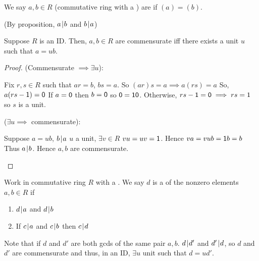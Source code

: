 \documentclass[notes.tex]{subfiles}
\begin{document}
\begin{defn}
	We say $a, b\in R$ (commutative ring with a \one) are  if $(a) = (b)$.

	(By proposition, $a\mkern2mu|\mkern1mu b$ and $b\mkern2mu|\mkern1mu a$)
\end{defn}

\begin{proposition}
	Suppose $R$ is an ID.
	Then, $a,b\in R$ are commensurate iff there exists a unit $u$ such that $a=ub$.
\end{proposition}
\begin{proof}
	(Commensurate $\implies \exists u$):
	\begin{tabin}
		Fix $r, s\in R$ such that $ar = b$, $bs = a$.
		So $(ar)s = a \implies a(rs) = a$ So, $a(rs-\mathsf{1}) = \mathsf{0}$
		If $a = \mathsf{0}$ then $b= \mathsf{0}$ so $\mathsf{0}=\mathsf{1}\mathsf{0}$.
		Otherwise, $rs - \mathsf{1} = \mathsf{0} \implies rs = 1$ so $s$ is a unit.
	\end{tabin}
	($\exists u \implies$ commensurate):
	\begin{tabin}
		Suppose $a=ub$, $b\mkern2mu|\mkern1mu a$ $u$ a unit, $\exists v\in R$ $vu = uv = \mathsf{1}$. Hence $va = vub = \mathsf{1} b = b$ Thus $a\mkern2mu|\mkern1mu b$. Hence $a, b$ are commensurate.
	\end{tabin}
\end{proof}

\begin{defn}
	Work in commutative ring $R$ with a \one. We say $d$ is a  of the nonzero elements $a,b\in R$
	if
	\begin{enumerate}
		\item $d\mkern2mu|\mkern1mu a$ and $d\mkern2mu|\mkern1mu b$
		\item If $c\mkern2mu|\mkern1mu a$ and $c\mkern2mu|\mkern1mu b$ then $c\mkern2mu|\mkern1mu d$
	\end{enumerate}
\end{defn}

Note that if $d$ and $d'$ are both gcds of the same pair $a,b$. $d\mkern2mu|\mkern1mu d'$ and $d'\mkern2mu|\mkern1mu d$, so $d$ and $d'$ are commensurate and thus, in an ID, $\exists u$ unit such that $d = ud'$.
\end{document}
